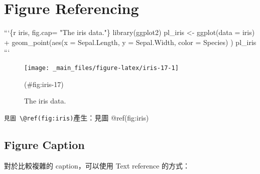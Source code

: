 \documentclass[oneside]{book}
\newenvironment{Shaded}{\begin{snugshade}}{\end{snugshade}}
\newcommand{\BaseNTok}[1]{\textcolor[rgb]{0.00,0.00,0.81}{#1}}
\newcommand{\NormalTok}[1]{#1}
\begin{document}
\hypertarget{figure-referencing-1}{%
\section{Figure Referencing}\label{figure-referencing-1}}

\begin{Shaded}
\begin{Highlighting}[]
\BaseNTok{```\{r iris, fig.cap= "The iris data."\}}
\BaseNTok{library(ggplot2)}
\BaseNTok{pl_iris <- ggplot(data = iris) +}
\BaseNTok{             geom_point(aes(x = Sepal.Length,}
\BaseNTok{                            y = Sepal.Width,}
\BaseNTok{                            color = Species)}
\BaseNTok{                        )}
\BaseNTok{pl_iris}
\BaseNTok{```}
\end{Highlighting}
\end{Shaded}

\begin{figure}

{\centering \texttt{[image: \_main\_files/figure-latex/iris-17-1]} 

}

\caption{The iris data.}(\#fig:iris-17)
\end{figure}

\texttt{見圖\ \textbackslash{}@ref(fig:iris)}產生：見圖 @ref(fig:iris)

\hypertarget{figure-caption-1}{%
\subsection{Figure Caption}\label{figure-caption-1}}

對於比較複雜的 caption，可以使用 Text reference 的方式：

\begin{Shaded}
\end{Shaded}
\end{document}
